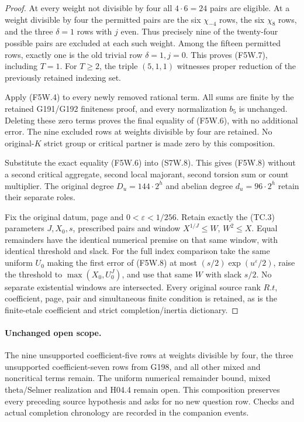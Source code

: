 \begin{proof}
At every weight not divisible by four all $4\cdot6=24$ pairs
are eligible. At a weight divisible by four the permitted pairs
are the six $\chi_{-4}$ rows, the six $\chi_8$ rows, and the
three $\delta=1$ rows with $j$ even. Thus precisely nine of the
twenty-four possible pairs are excluded at each such weight.
Among the fifteen permitted rows, exactly one is the old trivial
row $\delta=1,j=0$. This proves (F5W.7), including $T=1$.
For $T\geq2$, the triple $(5,1,1)$ witnesses proper reduction
of the previously retained indexing set.

Apply (F5W.4) to every newly removed rational term. All sums
are finite by the retained G191/G192 finiteness proof, and every
normalization $b_5$ is unchanged. Deleting these zero terms
proves the final equality of (F5W.6), with no additional error.
The nine excluded rows at weights divisible by four are retained.
No original-$K$ strict group or critical partner is made zero
by this composition.

Substitute the exact equality (F5W.6) into (S7W.8).
This gives (F5W.8) without a second critical aggregate,
second local majorant, second torsion sum or count multiplier.
The original degree $D_u=144\cdot2^h$ and abelian degree
$d_u=96\cdot2^h$ retain their separate roles.

Fix the original datum, page and $0<\varepsilon<1/256$.
Retain exactly the (TC.3) parameters $J,X_0,s$, prescribed pairs
and window $X^{1/J}\leq W$, $W^2\leq X$.
Equal remainders have the identical numerical premise on that
same window, with identical threshold and slack.
For the full index comparison take the same uniform $U_0$ making
the first error of (F5W.8) at most
$(s/2)\exp(u^\varepsilon/2)$, raise the threshold to
$\max(X_0,U_0^J)$, and use that same $W$ with slack $s/2$.
No separate existential windows are intersected. Every original
source rank $R.t$, coefficient, page, pair and simultaneous
finite condition is retained, as is the finite-etale coefficient
and strict completion/inertia dictionary.
\end{proof}

\paragraph{Unchanged open scope.}
The nine unsupported coefficient-five rows at weights divisible
by four, the three unsupported coefficient-seven rows from G198,
and all other mixed and noncritical terms remain. The uniform
numerical remainder bound, mixed theta/Selmer realization and
H04.4 remain open. This composition preserves every preceding
source hypothesis and asks for no new question row. Checks and
actual completion chronology are recorded in the companion events.
